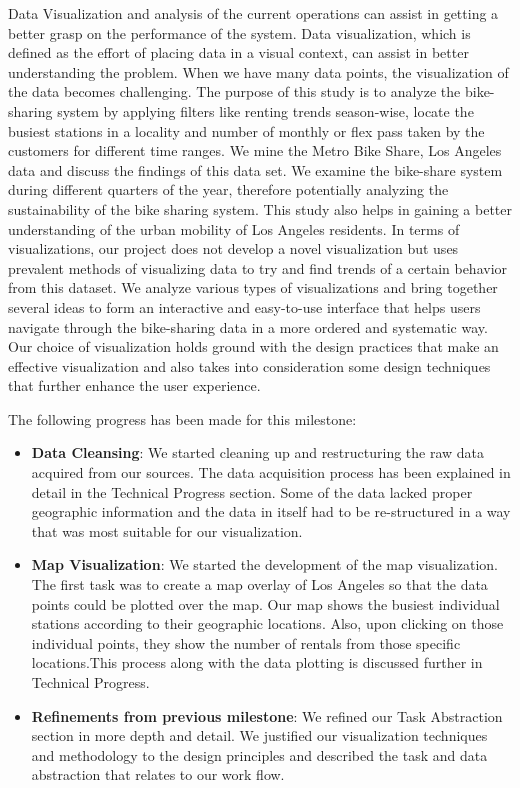 Data Visualization and analysis of the current operations can assist in getting a better grasp on the performance of the system. Data visualization, which is defined as the effort of placing data in a visual context, can assist in better understanding the problem. When we have many data points, the visualization of the data becomes challenging. The purpose of this study is to analyze the bike-sharing system by applying filters like renting trends season-wise, locate the busiest stations in a locality and number of monthly or flex pass taken by the customers for different time ranges. We mine the Metro Bike Share, Los Angeles data and discuss the findings of this data set. We examine the bike-share system during different quarters of the year, therefore potentially analyzing the sustainability of the bike sharing system. This study also helps in gaining a better understanding of the urban mobility of Los Angeles residents. In terms of visualizations, our project does not develop a novel visualization but uses prevalent methods of visualizing data to try and find trends of a certain behavior from this dataset. We analyze various types of visualizations and bring together several ideas to form an interactive and easy-to-use interface that helps users navigate through the bike-sharing data in a more ordered and systematic way. Our choice of visualization holds ground with the design practices that make an effective visualization and also takes into consideration some design techniques that further enhance the user experience.

The following progress has been made for this milestone:
\begin{itemize}
  \item \textbf{Data Cleansing}: We started cleaning up and restructuring the raw data acquired from our sources. The data acquisition process has been explained in detail in the Technical Progress section. Some of the data lacked proper geographic information and the data in itself had to be re-structured in a way that was most suitable for our visualization.
  \item \textbf{Map Visualization}: We started the development of the map visualization. The first task was to create a map overlay of Los Angeles so that the data points could be plotted over the map. Our map shows the busiest individual stations according to their geographic locations. Also, upon clicking on those individual points, they show the number of rentals from those specific locations.This process along with the data plotting is discussed further in Technical Progress.
  \item \textbf{Refinements from previous milestone}: We refined our Task Abstraction section in more depth and detail. We justified our visualization techniques and methodology to the design principles and described the task and data abstraction that relates to our work flow.
\end{itemize}
